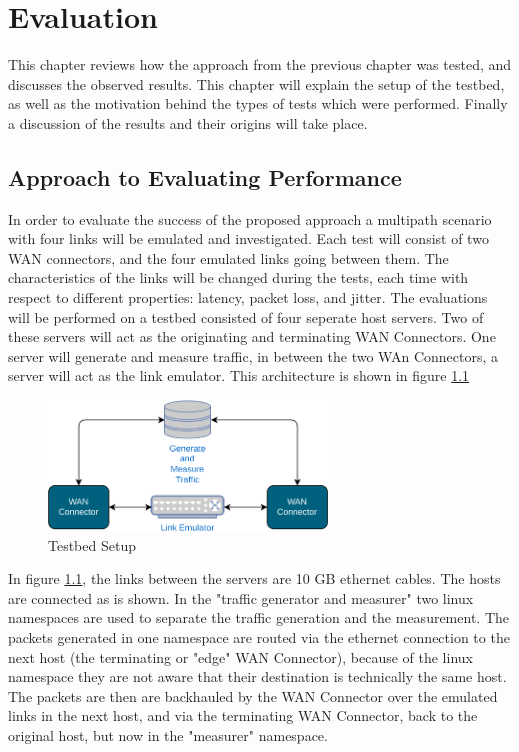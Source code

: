 
\cleardoublepage
\chapter{Evaluation}
\label{cha:evaluation}

This chapter reviews how the approach from the previous chapter was tested, and discusses the observed results. This chapter will explain the setup of the testbed, as well as the motivation behind the types of tests which were performed. Finally a discussion of the results and their origins will take place.


\section{Approach to Evaluating Performance}

In order to evaluate the success of the proposed approach a multipath scenario with four links will be emulated and investigated. Each test will consist of two WAN connectors, and the four emulated links going between them. The characteristics of the links will be changed during the tests, each time with respect to different properties: latency, packet loss, and jitter. The evaluations will be performed on a testbed consisted of four seperate host servers. Two of these servers will act as the originating and terminating WAN Connectors. One server will generate and measure traffic, in between the two WAn Connectors, a server will act as the link emulator. This architecture is shown in figure \ref{fig:testbed}

\begin{figure}[h]
    \centering
        \includegraphics[width=0.66\textwidth]{fig/testbed.png}
        \caption{Testbed Setup}
        \label{fig:testbed}
\end{figure}

In figure \ref{fig:testbed}, the links between the servers are 10 GB ethernet cables. The hosts are connected as is shown. In the "traffic generator and measurer" two linux namespaces are used to separate the traffic generation and the measurement. The packets generated in one namespace are routed via the ethernet connection to the next host (the terminating or "edge" WAN Connector), because of the linux namespace they are not aware that their destination is technically the same host. The packets are then are backhauled by the WAN Connector over the emulated links in the next host, and via the terminating WAN Connector, back to the original host, but now in the "measurer" namespace.

